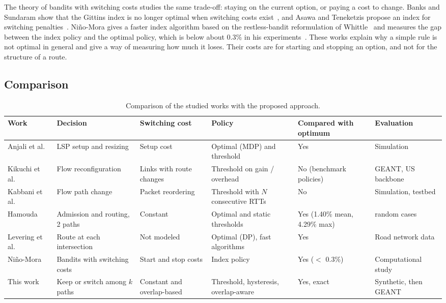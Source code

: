 \documentclass[11pt,a4paper]{article}
\begin{document}
The theory of bandits with switching costs studies the same trade-off: staying on the current option, or paying a cost to change. Banks and Sundaram show that the Gittins index is no longer optimal when switching costs exist~\cite{banks1994}, and Asawa and Teneketzis propose an index for switching penalties~\cite{asawa1996}. Ni\~no-Mora gives a faster index algorithm based on the restless-bandit reformulation of Whittle~\cite{whittle1988} and measures the gap between the index policy and the optimal policy, which is below about 0.3\% in his experiments~\cite{ninomora2008}. These works explain why a simple rule is not optimal in general and give a way of measuring how much it loses. Their costs are for starting and stopping an option, and not for the structure of a route.

\subsection{Comparison}

\begin{table}[ht]
\centering
\small
\renewcommand{\arraystretch}{1.2}
\begin{tabular}{@{}>{\raggedright\arraybackslash}p{2.2cm}>{\raggedright\arraybackslash}p{2.4cm}>{\raggedright\arraybackslash}p{2.2cm}>{\raggedright\arraybackslash}p{2.6cm}>{\raggedright\arraybackslash}p{2.3cm}>{\raggedright\arraybackslash}p{2.2cm}@{}}
\toprule
Work & Decision & Switching cost & Policy & Compared with optimum & Evaluation \\
\midrule
Anjali et al.~\cite{anjali2002} & LSP setup and resizing & Setup cost & Optimal (MDP) and threshold & Yes & Simulation \\
Kikuchi et al.~\cite{kikuchi2025} & Flow reconfiguration & Links with route changes & Threshold on gain / overhead & No (benchmark policies) & GEANT, US backbone \\
Kabbani et al.~\cite{kabbani2014} & Flow path change & Packet reordering & Threshold with $N$ consecutive RTTs & No & Simulation, testbed \\
Hamouda~\cite{hamouda2020} & Admission and routing, 2 paths & Constant & Optimal and static thresholds & Yes (1.40\% mean, 4.29\% max) & 100 random cases \\
Levering et al.~\cite{levering2022} & Route at each intersection & Not modeled & Optimal (DP), fast algorithms & Yes & Road network data \\
Ni\~no-Mora~\cite{ninomora2008} & Bandits with switching costs & Start and stop costs & Index policy & Yes ($<$ 0.3\%) & Computational study \\
\midrule
This work & Keep or switch among $k$ paths & Constant and overlap-based & Threshold, hysteresis, overlap-aware & Yes, exact & Synthetic, then GEANT \\
\bottomrule
\end{tabular}
\caption{Comparison of the studied works with the proposed approach.}
\label{tab:comparison}
\end{table}
\end{document}
